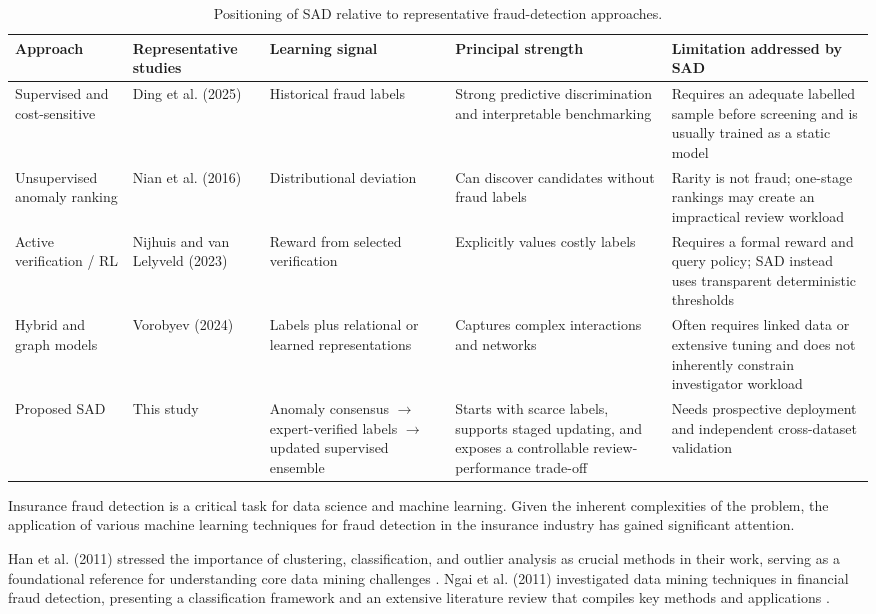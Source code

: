 \documentclass[12pt]{article}
\begin{document}
\begin{table}[H]
\centering
\caption{Positioning of SAD relative to representative fraud-detection approaches.}
\label{tab:positioning}
\scriptsize
\begin{tabularx}{\textwidth}{>{\raggedright\arraybackslash}p{2.05cm}>{\raggedright\arraybackslash}p{2.45cm}>{\raggedright\arraybackslash}p{2.55cm}>{\raggedright\arraybackslash}X>{\raggedright\arraybackslash}X}
\toprule
Approach & Representative studies & Learning signal & Principal strength & Limitation addressed by SAD \\
\midrule
Supervised and cost-sensitive & Ding et al. (2025) & Historical fraud labels & Strong predictive discrimination and interpretable benchmarking & Requires an adequate labelled sample before screening and is usually trained as a static model \\
Unsupervised anomaly ranking & Nian et al. (2016) & Distributional deviation & Can discover candidates without fraud labels & Rarity is not fraud; one-stage rankings may create an impractical review workload \\
Active verification / RL & Nijhuis and van Lelyveld (2023) & Reward from selected verification & Explicitly values costly labels & Requires a formal reward and query policy; SAD instead uses transparent deterministic thresholds \\
Hybrid and graph models & Vorobyev (2024) & Labels plus relational or learned representations & Captures complex interactions and networks & Often requires linked data or extensive tuning and does not inherently constrain investigator workload \\
Proposed SAD & This study & Anomaly consensus $\rightarrow$ expert-verified labels $\rightarrow$ updated supervised ensemble & Starts with scarce labels, supports staged updating, and exposes a controllable review-performance trade-off & Needs prospective deployment and independent cross-dataset validation \\
\bottomrule
\end{tabularx}
\end{table}

\iffalse
Insurance fraud detection is a critical task for data science and
machine learning. Given the inherent complexities of the problem,
the application of various machine learning techniques for fraud
detection in the insurance industry has gained significant
attention.

Han et al. (2011) stressed the importance of clustering,
classification, and outlier analysis as crucial methods in their
work, serving as a foundational reference for understanding core
data mining challenges \cite{A71}. Ngai et al. (2011) investigated
data mining techniques in financial fraud detection, presenting a
classification framework and an extensive literature review that
compiles key methods and applications \cite{A76}.
\end{document}
